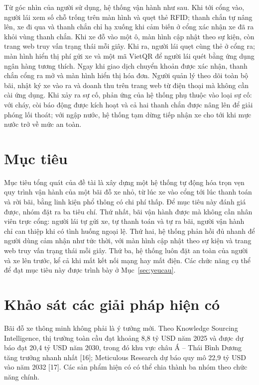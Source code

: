 Từ góc nhìn của người sử dụng, hệ thống vận hành như sau. Khi tới cổng vào, người lái xem
số chỗ trống trên màn hình và quẹt thẻ RFID; thanh chắn tự nâng lên, xe đi qua và thanh
chắn chỉ hạ xuống khi cảm biến ở cổng xác nhận xe đã ra khỏi vùng thanh chắn. Khi xe đỗ vào
một ô, màn hình cập nhật theo sự kiện, còn trang web truy vấn trạng thái mỗi giây. Khi ra, người lái quẹt cùng thẻ ở cổng ra; màn hình hiển thị phí gửi xe và một mã
VietQR để người lái quét bằng ứng dụng ngân hàng tương thích. Ngay khi giao dịch chuyển khoản được xác
nhận, thanh chắn cổng ra mở và màn hình hiển thị hóa đơn. Người quản lý theo dõi toàn bộ
bãi, nhật ký xe vào ra và doanh thu trên trang web từ điện thoại mà không cần cài ứng dụng.
Khi xảy ra sự cố, phản ứng của hệ thống phụ thuộc vào loại sự cố: với cháy, còi báo động
được kích hoạt và cả hai thanh chắn được nâng lên để giải phóng lối thoát; với ngập nước, hệ
thống tạm dừng tiếp nhận xe cho tới khi mực nước trở về mức an toàn.

\section{Mục tiêu}
Mục tiêu tổng quát của đề tài là xây dựng một hệ thống tự động hóa trọn vẹn quy trình vận hành
của một bãi đỗ xe nhỏ, từ lúc xe vào cổng tới lúc thanh toán và rời bãi, bằng linh kiện phổ
thông có chi phí thấp. Để mục tiêu này đánh giá được, nhóm đặt ra ba tiêu chí. Thứ nhất, bãi vận
hành được mà không cần nhân viên trực cổng: người lái tự gửi xe, tự thanh toán và tự ra bãi,
người vận hành chỉ can thiệp khi có tình huống ngoại lệ. Thứ hai, hệ thống phản hồi đủ nhanh để
người dùng cảm nhận như tức thời, với màn hình cập nhật theo sự kiện và trang web truy vấn trạng thái mỗi giây. Thứ ba, hệ thống luôn đặt an toàn của người và xe lên trước, kể cả khi mất kết nối
mạng hay mất điện. Các chức năng cụ thể để đạt mục tiêu này được trình bày ở
Mục~\ref{sec:yeucau}.

\section{Khảo sát các giải pháp hiện có}\label{sec:thitruong}
Bãi đỗ xe thông minh không phải là ý tưởng mới. Theo Knowledge Sourcing Intelligence, thị
trường toàn cầu đạt khoảng 8,8 tỷ USD năm 2025 và được dự báo đạt 20,4 tỷ USD năm 2030, trong
đó khu vực châu Á -- Thái Bình Dương tăng trưởng nhanh nhất [16]; Meticulous Research dự báo
quy mô 22,9 tỷ USD vào năm 2032 [17]. Các sản phẩm hiện có có thể chia thành ba nhóm theo
chức năng chính.

